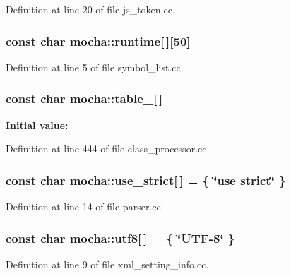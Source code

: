 Definition at line 20 of file js\_\-token.cc.

\hypertarget{namespacemocha_a3ebf6f54b4e4fa156c76f20a1b67094e}{
\subsubsection[{runtime}]{\setlength{\rightskip}{0pt plus 5cm}const char {\bf mocha::runtime}\mbox{[}$\,$\mbox{]}\mbox{[}50\mbox{]}}}
\label{namespacemocha_a3ebf6f54b4e4fa156c76f20a1b67094e}


Definition at line 5 of file symbol\_\-list.cc.

\hypertarget{namespacemocha_a79233380c6ba0832a54e749c1858899e}{
\subsubsection[{table\_\-}]{\setlength{\rightskip}{0pt plus 5cm}const char {\bf mocha::table\_\-}\mbox{[}$\,$\mbox{]}}}
\label{namespacemocha_a79233380c6ba0832a54e749c1858899e}
{\bfseries Initial value:}


Definition at line 444 of file class\_\-processor.cc.

\hypertarget{namespacemocha_aff8b386388ac986cc23a7a9837a220d8}{
\subsubsection[{use\_\-strict}]{\setlength{\rightskip}{0pt plus 5cm}const char {\bf mocha::use\_\-strict}\mbox{[}$\,$\mbox{]} = \{ \char`\"{}use strict\char`\"{} \}}}
\label{namespacemocha_aff8b386388ac986cc23a7a9837a220d8}


Definition at line 14 of file parser.cc.

\hypertarget{namespacemocha_ae15376d73de0562542f55fee7bab227d}{
\subsubsection[{utf8}]{\setlength{\rightskip}{0pt plus 5cm}const char {\bf mocha::utf8}\mbox{[}$\,$\mbox{]} = \{ \char`\"{}UTF-\/8\char`\"{} \}}}
\label{namespacemocha_ae15376d73de0562542f55fee7bab227d}


Definition at line 9 of file xml\_\-setting\_\-info.cc.

